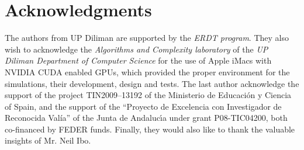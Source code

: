 \documentclass{svmultm}
\begin{document}
\section{ Acknowledgments }
The authors from UP Diliman are supported by the \textit{ERDT program}. They also wish to acknowledge the \textit{Algorithms and Complexity laboratory} of the \textit{UP Diliman Department of Computer Science} for the use of Apple iMacs with NVIDIA CUDA enabled GPUs, which provided the proper environment for the simulations, their development, design and tests. {The last author acknowledge the support of the project TIN2009--13192 of the Ministerio de Educaci\'on y Ciencia of Spain, and the support of the ``Proyecto de Excelencia con Investigador de Reconocida Val\'ia'' of the Junta de Andaluc\'{\i}a under grant P08-TIC04200, both co-financed by FEDER funds.}
Finally, they would also like to thank the valuable insights of Mr. Neil Ibo.


%
%
\end{document}
